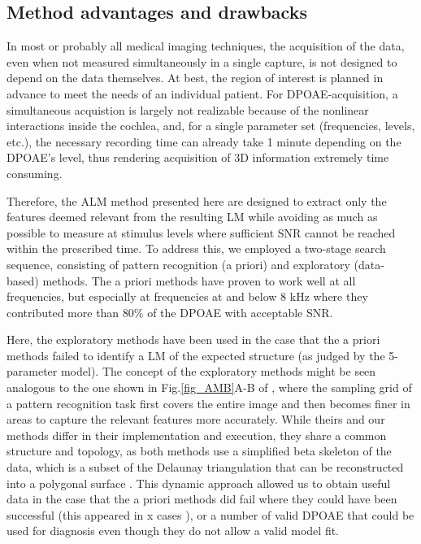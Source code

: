 \documentclass[journal,twoside,web]{ieeecolor2}
\begin{document}
\subsection{Method advantages and drawbacks}
In most or probably all medical imaging techniques, the acquisition of the data, even when not measured simultaneously in a single capture, is not designed to depend on the data themselves.
At best, the region of interest is planned in advance to meet the needs of an individual patient.
For DPOAE-acquisition, a simultaneous acquistion is largely not realizable because of the nonlinear interactions inside the cochlea, and, for a single parameter set (frequencies, levels, etc.), the necessary recording time can already take 1 minute depending on the DPOAE's level, thus rendering acquisition of 3D information extremely time consuming.

Therefore, the ALM method presented here are designed to extract only the features deemed relevant from the resulting LM while avoiding as much as possible to measure at stimulus levels where sufficient SNR cannot be reached within the prescribed time.
To address this, we employed a two-stage search sequence, consisting of pattern recognition (a priori) and exploratory (data-based) methods.
The a priori methods have proven to work well at all frequencies, but especially at frequencies at and below 8 kHz where they contributed more than 80\% of the DPOAE with acceptable SNR.

Here, the exploratory methods have been used in the case that the a priori methods failed to identify a LM of the expected structure (as judged by the 5-parameter model).
 The concept of the exploratory methods might be seen analogous to the one shown in Fig.\ref{fig_AMB}A-B of  \cite{Ch1997}, where the sampling grid of a pattern recognition task first covers the entire image and then becomes finer in areas to capture the relevant features more accurately.
While theirs and our methods differ in their implementation and execution, they share a common structure and topology, as both methods use a simplified beta skeleton of the data, which is a subset of the Delaunay triangulation that can be reconstructed into a polygonal surface \cite{Ep1998}.
This dynamic approach allowed us to obtain useful data in the case that the a priori methods did fail where they could have been successful (this appeared in x cases ), or a number of valid DPOAE that could be used for diagnosis even though they do not allow a valid model fit.
\end{document}

